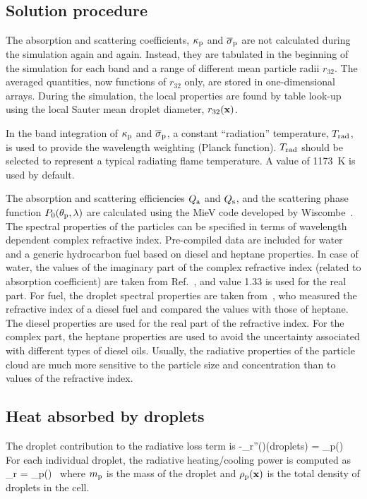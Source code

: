\subsection{Solution procedure}

The absorption and scattering coefficients, $\kappa_{\rm p}$ and $\overline{\sigma}_{\rm p}$ are not calculated during the simulation again and again. Instead, they
are tabulated in the beginning of the simulation for each band and a range of different mean particle radii $r_{32}$.
The averaged quantities, now functions of $r_{32}$ only, are stored in one-dimensional arrays.
During the simulation, the local properties are found by table look-up using the local Sauter mean droplet diameter, $r_{32}({\mathbf{x}})$.

In the band integration of $\kappa_{\rm p}$ and $\overline{\sigma}_{\rm p}$, a constant ``radiation'' temperature, $T_{\rm rad}$, is used
to provide the wavelength weighting (Planck function).  $T_{\rm rad}$ should be selected to represent a typical radiating flame
temperature. A value of 1173~K is used by default.

The absorption and scattering efficiencies $Q_{\rm a}$ and $Q_{\rm s}$, and the scattering phase
function $P_0(\theta_{\rm p},\lambda)$ are calculated using the MieV code developed by Wiscombe~\cite{Wiscombe}.
The spectral properties of the particles can be specified in terms of wavelength dependent complex refractive index.
Pre-compiled data are included for water and a generic hydrocarbon fuel based on diesel and heptane properties.
In case of water, the values of the imaginary part of the complex refractive index (related to absorption coefficient) are taken from
Ref.~\cite{Hale:1}, and value 1.33 is used for the real part.
For fuel, the droplet spectral properties are taken from~\cite{Dombrovsky:1}, who measured the refractive index
of a diesel fuel and compared the values with those of heptane. The diesel properties are used for the real part of the refractive index. For the complex
part, the heptane properties are used to avoid the uncertainty associated with different types of diesel oils. Usually, the radiative properties
of the particle cloud are much more sensitive to the particle size and concentration than to values of the refractive index.



\subsection{Heat absorbed by droplets}

The droplet contribution to the radiative
loss term is
\be -\nabla\!\cdot \dbq_{\rm r}''(\bx)(\mbox{droplets}) =
    \kappa_{\rm p}(\bx) \, \left[ U(\bx) - 4 \pi \, I_{{\rm b,p}}(\bx) \right]
\ee
For each individual droplet, the radiative heating/cooling power is
computed as
\be
\dq_{\rm r} = 
    \kappa_{\rm p}(\bx) \, \left[ U(\bx) - 4\pi \, I_{{\rm b,p}}(\bx) \right]
\ee
where $m_{\rm p}$ is the mass of the droplet and $\rho_{\rm p}({\mathbf{x}})$ is the total
density of droplets in the cell.\\





